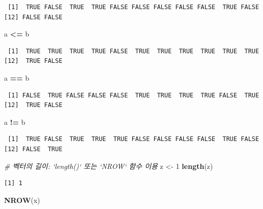 \documentclass[11pt,a4paper]{book}
\newenvironment{Shaded}{\begin{snugshade}}{\end{snugshade}}
\newcommand{\KeywordTok}[1]{\textcolor[rgb]{0.13,0.29,0.53}{\textbf{#1}}}
\newcommand{\DecValTok}[1]{\textcolor[rgb]{0.00,0.00,0.81}{#1}}
\newcommand{\StringTok}[1]{\textcolor[rgb]{0.31,0.60,0.02}{#1}}
\newcommand{\CommentTok}[1]{\textcolor[rgb]{0.56,0.35,0.01}{\textit{#1}}}
\newcommand{\OperatorTok}[1]{\textcolor[rgb]{0.81,0.36,0.00}{\textbf{#1}}}
\newcommand{\NormalTok}[1]{#1}
\theoremstyle{definition}
\theoremstyle{definition}
\theoremstyle{definition}
\theoremstyle{remark}
\begin{document}
\begin{verbatim}
 [1]  TRUE FALSE  TRUE  TRUE FALSE FALSE FALSE FALSE FALSE  TRUE FALSE
[12] FALSE FALSE
\end{verbatim}

\begin{Shaded}
\begin{Highlighting}[]
\NormalTok{a }\OperatorTok{<=}\StringTok{ }\NormalTok{b}
\end{Highlighting}
\end{Shaded}

\begin{verbatim}
 [1]  TRUE  TRUE  TRUE  TRUE FALSE  TRUE  TRUE  TRUE  TRUE  TRUE  TRUE
[12]  TRUE FALSE
\end{verbatim}

\begin{Shaded}
\begin{Highlighting}[]
\NormalTok{a }\OperatorTok{==}\StringTok{ }\NormalTok{b}
\end{Highlighting}
\end{Shaded}

\begin{verbatim}
 [1] FALSE  TRUE FALSE FALSE FALSE  TRUE  TRUE  TRUE  TRUE FALSE  TRUE
[12]  TRUE FALSE
\end{verbatim}

\begin{Shaded}
\begin{Highlighting}[]
\NormalTok{a }\OperatorTok{!=}\StringTok{ }\NormalTok{b}
\end{Highlighting}
\end{Shaded}

\begin{verbatim}
 [1]  TRUE FALSE  TRUE  TRUE  TRUE FALSE FALSE FALSE FALSE  TRUE FALSE
[12] FALSE  TRUE
\end{verbatim}

\begin{Shaded}
\begin{Highlighting}[]
\CommentTok{# 벡터의 길이: `length()` 또는 `NROW` 함수 이용}
\NormalTok{z <-}\StringTok{ }\DecValTok{1}
\KeywordTok{length}\NormalTok{(z)}
\end{Highlighting}
\end{Shaded}

\begin{verbatim}
[1] 1
\end{verbatim}

\begin{Shaded}
\begin{Highlighting}[]
\KeywordTok{NROW}\NormalTok{(x)}
\end{Highlighting}
\end{Shaded}
\end{document}
